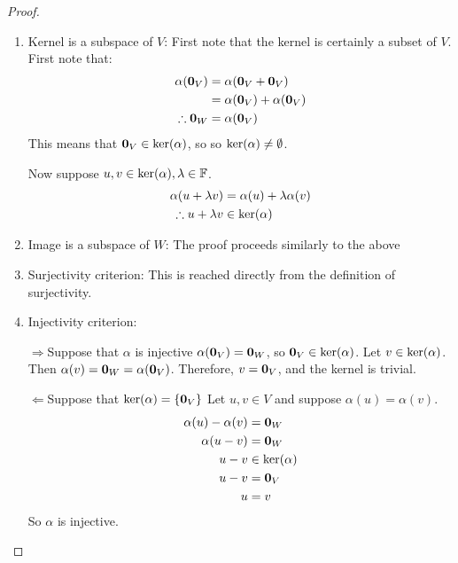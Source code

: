 \documentclass[../Main.tex]{subfiles}
\begin{document}
\begin{proof}
    \begin{enumerate}
        \item Kernel is a subspace of $V$:
            First note that the kernel is certainly a subset of $V$. First note that:
            \begin{align*}
                \alpha(\boldsymbol{0}_V) &= \alpha(\boldsymbol{0}_V + \boldsymbol{0}_V) \\
                &= \alpha(\boldsymbol{0}_V) + \alpha(\boldsymbol{0}_V) \\
                \therefore \boldsymbol{0}_W &= \alpha(\boldsymbol{0}_V)
            \end{align*}
            This means that $\boldsymbol{0}_V \in \ker(\alpha)$, so so $\ker(\alpha) \neq \emptyset$.

            Now suppose $u, v \in \ker(\alpha), \lambda \in \mathbb{F}$.
            \begin{align*}
                \alpha(u + \lambda v) &= \alpha(u) + \lambda \alpha(v) \\
                \therefore u + \lambda v &\in \ker(\alpha)
            \end{align*}
        \item Image is a subspace of $W$:
            The proof proceeds similarly to the above
        \item Surjectivity criterion:
            This is reached directly from the definition of surjectivity.
        \item Injectivity criterion:
            \begin{proofdirection}{$\Rightarrow$}{Suppose that $\alpha$ is injective}
                $\alpha(\boldsymbol{0}_V) = \boldsymbol{0}_W$, so $\boldsymbol{0}_V \in \ker(\alpha)$. Let $v \in \ker(\alpha)$. Then $\alpha(v) = \boldsymbol{0}_W = \alpha(\boldsymbol{0}_V)$. Therefore, $v = \boldsymbol{0}_V$, and the kernel is trivial.
            \end{proofdirection}            
            \begin{proofdirection}{$\Leftarrow$}{Suppose that $\ker(\alpha) = \{\boldsymbol{0}_V\}$}
                Let $u, v \in V$ and suppose $\alpha(u) = \alpha(v)$.
                \begin{align*}
                    \alpha(u) - \alpha(v) &= \boldsymbol{0}_W \\
                    \alpha(u - v) &= \boldsymbol{0}_W \\
                    u - v &\in \ker(\alpha) \\
                    u - v &= \boldsymbol{0}_V \\
                    u &= v
                \end{align*}
                So $\alpha$ is injective.
            \end{proofdirection}
    \end{enumerate}
\end{proof}
\end{document}
